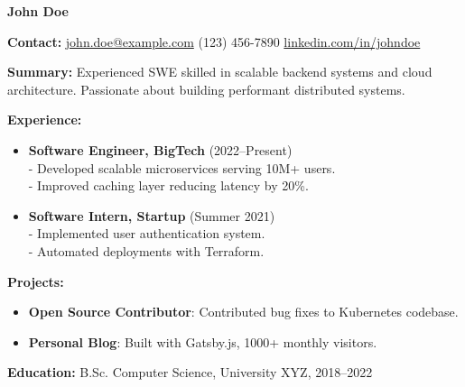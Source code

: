 \documentclass[a4paper,10pt]{article}
\begin{document}
\centerline{\LARGE \textbf{John Doe}}

\medskip

\noindent\textbf{Contact:} \href{mailto:john.doe@example.com}{john.doe@example.com} \textbar{} (123) 456-7890 \textbar{} \href{https://linkedin.com/in/johndoe}{linkedin.com/in/johndoe}

\medskip

\noindent\textbf{Summary:} Experienced SWE skilled in scalable backend systems and cloud architecture. Passionate about building performant distributed systems.

\medskip

\noindent\textbf{Experience:}

\begin{itemize}[leftmargin=*]
    \item \textbf{Software Engineer, BigTech} (2022–Present) \\
    - Developed scalable microservices serving 10M+ users. \\
    - Improved caching layer reducing latency by 20\%.

    \item \textbf{Software Intern, Startup} (Summer 2021) \\
    - Implemented user authentication system. \\
    - Automated deployments with Terraform.
\end{itemize}

\medskip

\noindent\textbf{Projects:}

\begin{itemize}[leftmargin=*]
    \item \textbf{Open Source Contributor}: Contributed bug fixes to Kubernetes codebase.
    \item \textbf{Personal Blog}: Built with Gatsby.js, 1000+ monthly visitors.
\end{itemize}

\medskip

\noindent\textbf{Education:} B.Sc. Computer Science, University XYZ, 2018–2022
\end{document}
